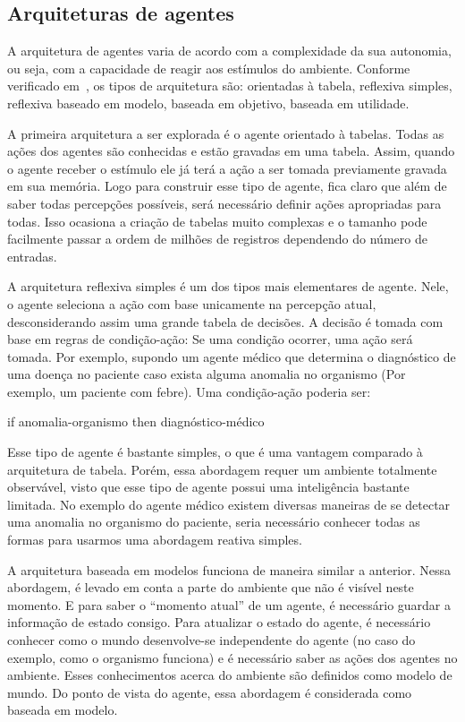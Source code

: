 \subsection{Arquiteturas de agentes}

A arquitetura de agentes varia de acordo com a complexidade da sua autonomia, ou seja, com a capacidade de reagir aos estímulos do ambiente. Conforme verificado em~\cite{novig95}, os tipos de arquitetura são: orientadas à tabela, reflexiva simples, reflexiva baseado em modelo, baseada em objetivo, baseada em utilidade.

A primeira arquitetura a ser explorada é o agente orientado à tabelas. Todas as ações dos agentes são conhecidas e estão gravadas em uma tabela. Assim, quando o agente receber o estímulo ele já terá a ação a ser tomada previamente gravada em sua memória. Logo para construir esse tipo de agente, fica claro que além de saber todas percepções possíveis, será necessário definir ações apropriadas para todas. Isso ocasiona a criação de tabelas muito complexas e o tamanho pode facilmente passar a ordem de milhões de registros dependendo do número de entradas.

A arquitetura reflexiva simples é um dos tipos mais elementares de agente. Nele, o agente seleciona a ação com base unicamente na percepção atual, desconsiderando assim uma grande tabela de decisões. A decisão é tomada com base em regras de condição-ação: Se uma condição ocorrer, uma ação será tomada. Por exemplo, supondo um agente médico que determina o diagnóstico de uma doença no paciente caso exista alguma anomalia no organismo (Por exemplo, um paciente com febre). Uma condição-ação poderia ser:

if anomalia-organismo then diagnóstico-médico

Esse tipo de agente é bastante simples, o que é uma vantagem comparado à arquitetura de tabela. Porém, essa abordagem requer um ambiente totalmente observável, visto que esse tipo de agente possui uma inteligência bastante limitada. No exemplo do agente médico existem diversas maneiras de se detectar uma anomalia no organismo do paciente, seria necessário conhecer todas as formas para usarmos uma abordagem reativa simples.

A arquitetura baseada em modelos funciona de maneira similar a anterior. Nessa abordagem, é levado em conta a parte do ambiente que não é visível neste momento. E para saber o ``momento atual'' de um agente, é necessário guardar a informação de estado consigo. Para atualizar o estado do agente, é necessário conhecer como o mundo desenvolve-se independente do agente (no caso do exemplo, como o organismo funciona) e é necessário saber as ações dos agentes no ambiente. Esses conhecimentos acerca do ambiente são definidos como modelo de mundo. Do ponto de vista do agente, essa abordagem é considerada como baseada em modelo.

